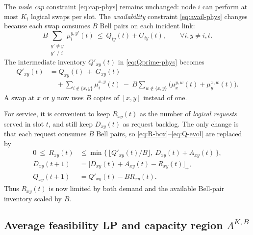 \documentclass[11pt]{article}
\begin{document}

The \emph{node cap} constraint \eqref{eq:cap-phys} remains unchanged:
node $i$ can perform at most $K_i$ logical swaps per slot. The
\emph{availability} constraint \eqref{eq:avail-phys} changes because
each swap consumes $B$ Bell pairs on each incident link:
\begin{equation}
B\sum_{\substack{y'\neq y\\ y'\neq i}}\mu_i^{y,y'}(t)
\ \le\ Q_{iy}(t)+G_{iy}(t),
\qquad \forall i,y\neq i,t.
\label{eq:avail-dist}
\end{equation}
The intermediate inventory $Q'_{xy}(t)$ in \eqref{eq:Qprime-phys}
becomes
\begin{equation}
\begin{aligned}
Q'_{xy}(t)
&= Q_{xy}(t)\ +\ G_{xy}(t) \\
&\quad + \sum_{i\notin\{x,y\}}\mu_i^{x,y}(t)
\ -\ B\sum_{w\notin\{x,y\}}
\big(\mu_x^{y,w}(t)+\mu_y^{x,w}(t)\big).
\end{aligned}
\label{eq:Qprime-dist}
\end{equation}
A swap at $x$ or $y$ now uses $B$ copies of $[x,y]$ instead of one.

For service, it is convenient to keep $R_{xy}(t)$ as the number of
\emph{logical requests} served in slot $t$, and still keep
$D_{xy}(t)$ as request backlog. The only change is that each request
consumes $B$ Bell pairs, so \eqref{eq:R-box}–\eqref{eq:Q-evol} are
replaced by
\begin{align}
0\ \le\ R_{xy}(t)
&\le \min\Big\{\,\big\lfloor Q'_{xy}(t)/B\big\rfloor,\ D_{xy}(t)+A_{xy}(t)\,\Big\},
\label{eq:R-box-dist}\\
D_{xy}(t{+}1)
&=\big[D_{xy}(t)+A_{xy}(t)-R_{xy}(t)\big]_+ , \label{eq:D-backlog-dist}\\
Q_{xy}(t{+}1)
&= Q'_{xy}(t) - B R_{xy}(t).
\label{eq:Q-evol-dist}
\end{align}
Thus $R_{xy}(t)$ is now limited by both demand and the available
Bell-pair inventory scaled by $B$.

\subsection{Average feasibility LP and capacity region $\Lambda^{K,B}$}
\end{document}
